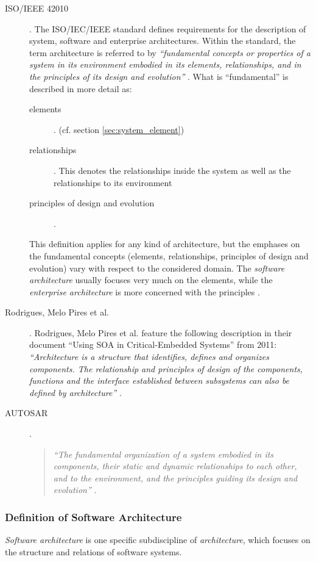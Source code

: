 \begin{description}
\item [ISO/IEEE 42010].
The ISO/IEC/IEEE standard defines requirements for the description of system, software and enterprise architectures. Within the standard, the term architecture is referred to by \emph{``fundamental concepts or properties of a system in its environment embodied in its elements, relationships, and in the principles of its design and evolution''} \cite{ISO_42010}. What is ``fundamental'' is described in more detail as:
	\begin{description}
		\item [elements]. (cf. section \ref{sec:system_element})
		\item [relationships]. This denotes the relationships inside the system as well as the relationships to its environment
		\item [principles of design and evolution].
	\end{description}
This definition applies for any kind of architecture, but the emphases on the fundamental concepts (elements, relationships, principles of design and evolution) vary with respect to the considered domain. The \emph{software architecture} usually focuses very much on the elements, while the \emph{enterprise architecture} is more concerned with the principles \cite{ISO_42010}.

\item [Rodrigues, Melo Pires et al.].
Rodrigues, Melo Pires et al. feature the following description in their document ``Using SOA in Critical-Embedded Systems'' from 2011:
\emph{``Architecture is a structure that identifies, defines and organizes components. The relationship and principles of design of the components, functions and the interface established between subsystems can also be defined by architecture''} \cite{rodrigues2011}.

\item [AUTOSAR].
\begin{quote}
\emph{``The fundamental organization of a system embodied in its components, their static and dynamic relationships to each other, and to the environment, and the principles guiding its design and evolution''} \cite{autosar_glossary}.
\end{quote}
\end{description}

\subsubsection{Definition of Software Architecture}
\emph{Software architecture} is one specific subdiscipline of \emph{architecture}, which focuses on the structure and relations of software systems. 

